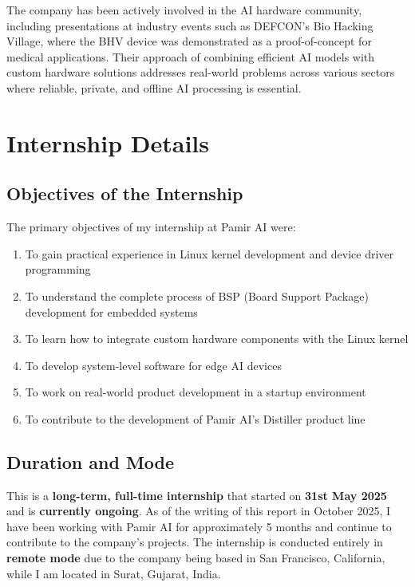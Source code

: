 \documentclass[12pt,a4paper]{report}
\begin{document}
\vspace{0.3cm}

The company has been actively involved in the AI hardware community, including presentations at industry events such as DEFCON's Bio Hacking Village, where the BHV device was demonstrated as a proof-of-concept for medical applications. Their approach of combining efficient AI models with custom hardware solutions addresses real-world problems across various sectors where reliable, private, and offline AI processing is essential.

\chapter{Internship Details}

\section{Objectives of the Internship}

The primary objectives of my internship at Pamir AI were:

\begin{enumerate}[itemsep=0.3cm]
    \item To gain practical experience in Linux kernel development and device driver programming
    \item To understand the complete process of BSP (Board Support Package) development for embedded systems
    \item To learn how to integrate custom hardware components with the Linux kernel
    \item To develop system-level software for edge AI devices
    \item To work on real-world product development in a startup environment
    \item To contribute to the development of Pamir AI's Distiller product line
\end{enumerate}

\section{Duration and Mode}

This is a \textbf{long-term, full-time internship} that started on \textbf{31st May 2025} and is \textbf{currently ongoing}. As of the writing of this report in October 2025, I have been working with Pamir AI for approximately 5 months and continue to contribute to the company's projects. The internship is conducted entirely in \textbf{remote mode} due to the company being based in San Francisco, California, while I am located in Surat, Gujarat, India.
\end{document}
